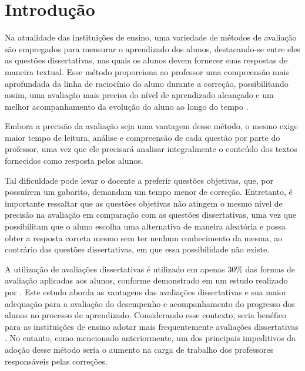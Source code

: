 \chapter{Introdução}

Na atualidade das instituições de ensino, uma variedade de métodos de avaliação são empregados para mensurar o aprendizado dos alunos, destacando-se entre eles as questões dissertativas, nas quais os alunos devem fornecer suas respostas de maneira textual. Esse método proporciona ao professor uma compreensão mais aprofundada da linha de raciocínio do aluno durante a correção, possibilitando assim, uma avaliação mais precisa do nível de aprendizado alcançado e um melhor acompanhamento da evolução do aluno ao longo do tempo \cite{artigoPorcentagemQuestoes}.

Embora a precisão da avaliação seja uma vantagem desse método, o mesmo exige maior tempo de leitura, análise e compreensão de cada questão por parte do professor, uma vez que ele precisará analisar integralmente o conteúdo dos textos fornecidos como resposta pelos alunos. 

Tal dificuldade pode levar o docente a preferir questões objetivas, que, por possuírem um gabarito, demandam um tempo menor de correção. Entretanto, é importante ressaltar que as questões objetivas não atingem o mesmo nível de precisão na avaliação em comparação com as questões dissertativas, uma vez que possibilitam que o aluno escolha uma alternativa de maneira aleatória e possa obter a resposta correta mesmo sem ter nenhum conhecimento da mesma, ao contrário das questões dissertativas, em que essa possibilidade não existe.

A utilização de avaliações dissertativas é utilizado em apenas 30\% das formas de avaliação aplicadas aos alunos, conforme demonstrado em um estudo realizado por %
\textcite{artigoPorcentagemQuestoes}. Este estudo aborda as vantagens das avaliações dissertativas e sua maior adequação para a avaliação do desempenho e acompanhamento do progresso dos alunos no processo de aprendizado. Considerando esse contexto, seria benéfico para as instituições de ensino adotar mais frequentemente avaliações dissertativas \cite{artigoPorcentagemQuestoes}. No entanto, como mencionado anteriormente, um dos principais impeditivos da adoção desse método seria o aumento na carga de trabalho dos professores responsáveis pelas correções. 

